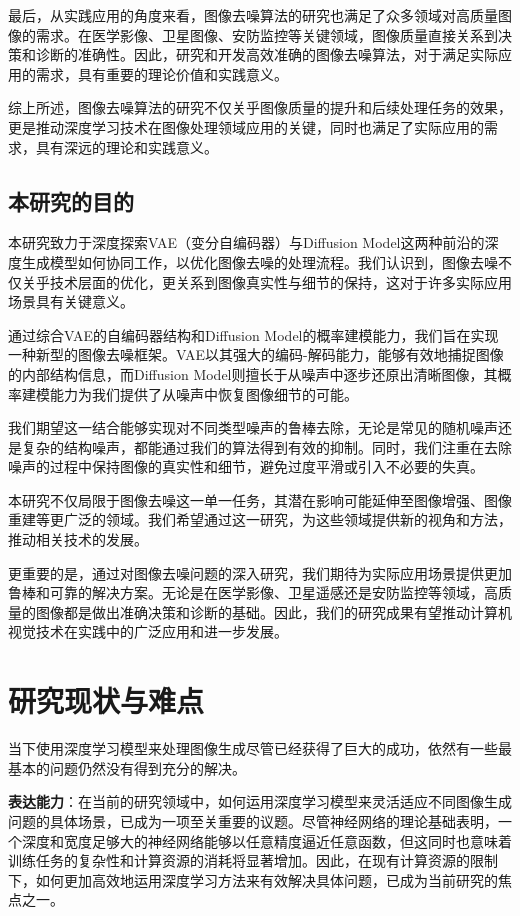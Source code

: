 最后，从实践应用的角度来看，图像去噪算法的研究也满足了众多领域对高质量图像的需求。在医学影像、卫星图像、安防监控等关键领域，图像质量直接关系到决策和诊断的准确性。因此，研究和开发高效准确的图像去噪算法，对于满足实际应用的需求，具有重要的理论价值和实践意义。

综上所述，图像去噪算法的研究不仅关乎图像质量的提升和后续处理任务的效果，更是推动深度学习技术在图像处理领域应用的关键，同时也满足了实际应用的需求，具有深远的理论和实践意义。
\subsection*{本研究的目的}
本研究致力于深度探索VAE（变分自编码器）与Diffusion Model这两种前沿的深度生成模型如何协同工作，以优化图像去噪的处理流程。我们认识到，图像去噪不仅关乎技术层面的优化，更关系到图像真实性与细节的保持，这对于许多实际应用场景具有关键意义。

通过综合VAE的自编码器结构和Diffusion Model的概率建模能力，我们旨在实现一种新型的图像去噪框架。VAE以其强大的编码-解码能力，能够有效地捕捉图像的内部结构信息，而Diffusion Model则擅长于从噪声中逐步还原出清晰图像，其概率建模能力为我们提供了从噪声中恢复图像细节的可能。

我们期望这一结合能够实现对不同类型噪声的鲁棒去除，无论是常见的随机噪声还是复杂的结构噪声，都能通过我们的算法得到有效的抑制。同时，我们注重在去除噪声的过程中保持图像的真实性和细节，避免过度平滑或引入不必要的失真。

本研究不仅局限于图像去噪这一单一任务，其潜在影响可能延伸至图像增强、图像重建等更广泛的领域。我们希望通过这一研究，为这些领域提供新的视角和方法，推动相关技术的发展。

更重要的是，通过对图像去噪问题的深入研究，我们期待为实际应用场景提供更加鲁棒和可靠的解决方案。无论是在医学影像、卫星遥感还是安防监控等领域，高质量的图像都是做出准确决策和诊断的基础。因此，我们的研究成果有望推动计算机视觉技术在实践中的广泛应用和进一步发展。
\section{研究现状与难点}
当下使用深度学习模型来处理图像生成尽管已经获得了巨大的成功，依然有一些最基本的问题仍然没有得到充分的解决。        


\textbf{表达能力}：在当前的研究领域中，如何运用深度学习模型来灵活适应不同图像生成问题的具体场景，已成为一项至关重要的议题。尽管神经网络的理论基础表明，一个深度和宽度足够大的神经网络能够以任意精度逼近任意函数，但这同时也意味着训练任务的复杂性和计算资源的消耗将显著增加。因此，在现有计算资源的限制下，如何更加高效地运用深度学习方法来有效解决具体问题，已成为当前研究的焦点之一。   


